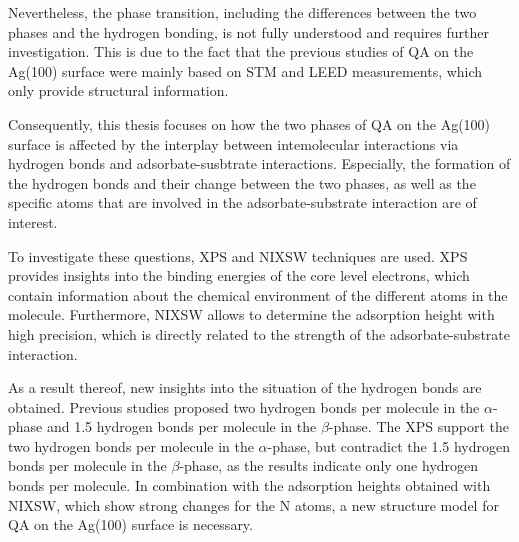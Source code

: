 Nevertheless, the phase transition, including the differences between the two phases and the hydrogen bonding, is not fully understood and requires further investigation. This is due to the fact that the previous studies of \ac{QA} on the Ag(100) surface were mainly based on \ac{STM} and \ac{LEED} measurements, which only provide structural information.\autocite{Humberg2020,Humberg2025}

Consequently, this thesis focuses on how the two phases of \ac{QA} on the Ag(100) surface is affected by the interplay between intemolecular interactions via hydrogen bonds and adsorbate-susbtrate interactions. Especially, the formation of the hydrogen bonds and their change between the two phases, as well as the specific atoms that are involved in the adsorbate-substrate interaction are of interest.

To investigate these questions, \ac{XPS} and \ac{NIXSW} techniques are used. \Ac{XPS} provides insights into the binding energies of the core level electrons, which contain information about the chemical environment of the different atoms in the molecule. Furthermore, \ac{NIXSW} allows to determine the adsorption height with high precision, which is directly related to the strength of the adsorbate-substrate interaction.

As a result thereof, new insights into the situation of the hydrogen bonds are obtained. Previous studies proposed two hydrogen bonds per molecule in the $\alpha$-phase and 1.5 hydrogen bonds per molecule in the $\beta$-phase.\autocite{Humberg2020,Humberg2025} The \ac{XPS} support the two hydrogen bonds per molecule in the $\alpha$-phase, but contradict the 1.5 hydrogen bonds per molecule in the $\beta$-phase, as the results indicate only one hydrogen bonds per molecule. In combination with the adsorption heights obtained with \ac{NIXSW}, which show strong changes for the N atoms, a new structure model for \ac{QA} on the Ag(100) surface is necessary.

\cleardoublepage